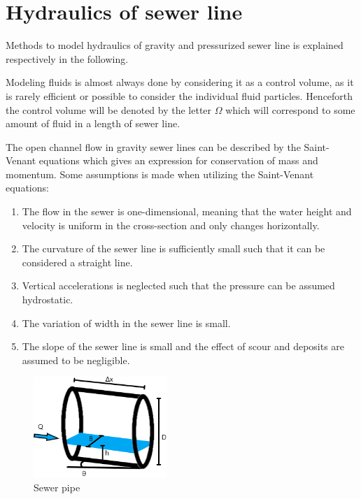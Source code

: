 \section{Hydraulics of sewer line}\label{se:hydraulics_of_sewer_line}

Methods to model hydraulics of gravity and pressurized sewer line is explained respectively in the following. 

Modeling fluids is almost always done by considering it as a control volume, as it is rarely efficient or possible to consider the individual fluid particles.
Henceforth the control volume will be denoted by the letter $\Omega$ which will correspond to some amount of fluid in a length of sewer line.

The open channel flow in gravity sewer lines can be described by the Saint-Venant equations which gives an expression for conservation of mass and momentum.
Some assumptions is made when utilizing the Saint-Venant equations:
\begin{table}[H]
\begin{enumerate}
\item The flow in the sewer is one-dimensional, meaning that the water height and velocity is uniform in the cross-section and only changes horizontally.
\item The curvature of the sewer line is sufficiently small such that it can be considered a straight line. 
\item Vertical accelerations is neglected such that the pressure can be assumed hydrostatic.
\item The variation of width in the sewer line is small.
\item The slope of the sewer line is small and the effect of scour and deposits are assumed to be negligible. 
\end{enumerate}
\label{tab:saintbernard_assumptions}
\end{table}


\begin{figure}[H]
\centering
\includegraphics[width=0.45\textwidth]{report/modeling/pictures/kloakroer.png}
\caption{Sewer pipe }
\label{fig:kloakroer}
\end{figure}



